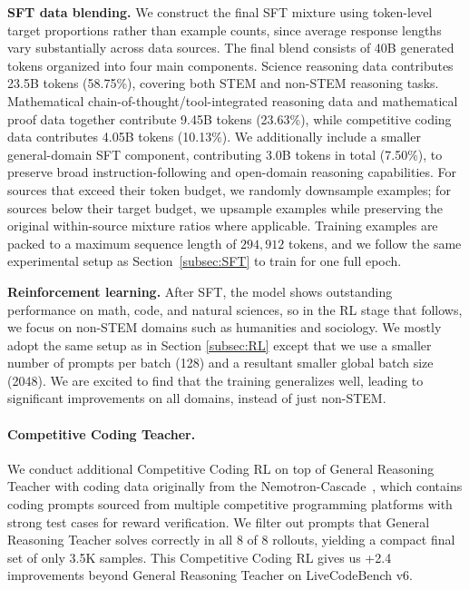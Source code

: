 \textbf{SFT data blending.}
We construct the final SFT mixture using token-level target proportions rather than example counts, since average response lengths vary substantially across data sources.
The final blend consists of 40B generated tokens organized into four main components.
Science reasoning data contributes 23.5B tokens (58.75\%), covering both STEM and non-STEM reasoning tasks.
Mathematical chain-of-thought/tool-integrated reasoning data and mathematical proof data together contribute 9.45B tokens (23.63\%), while competitive coding data contributes 4.05B tokens (10.13\%). We additionally include a smaller general-domain SFT component, contributing 3.0B tokens in total (7.50\%), to preserve broad instruction-following and open-domain reasoning capabilities.
For sources that exceed their token budget, we randomly downsample examples; for sources below their target budget, we upsample examples while preserving the original within-source mixture ratios where applicable. Training examples are packed to a maximum sequence length of $294{,}912$ tokens, and we follow the same experimental setup as Section~\ref{subsec:SFT} to train for one full epoch.


\textbf{Reinforcement learning.} After SFT, the model shows outstanding performance on math, code, and natural sciences, so in the RL stage that follows, we focus on non-STEM domains such as humanities and sociology. We mostly adopt the same setup as in Section \ref{subsec:RL} except that we use a smaller number of prompts per batch (128) and a resultant smaller global batch size (2048). We are excited to find that the training generalizes well, leading to significant improvements on all domains, instead of just non-STEM.



\paragraph{Competitive Coding Teacher.} We conduct additional Competitive Coding RL on top of General Reasoning Teacher with coding data originally from the Nemotron-Cascade~\citep{wang2025nemotroncascadescalingcascadedreinforcement, yang2026nemotron}, which contains coding prompts sourced from multiple competitive programming platforms with strong test cases for reward verification. We filter out prompts that General Reasoning Teacher solves correctly in all 8 of 8 rollouts, yielding a compact final set of only 3.5K samples. This Competitive Coding RL gives us +2.4 improvements beyond General Reasoning Teacher on LiveCodeBench v6.





